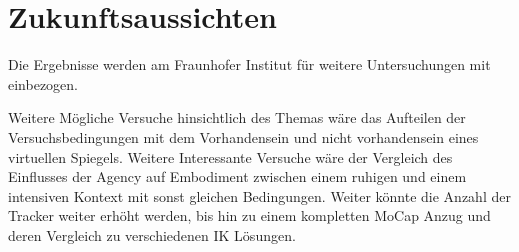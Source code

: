 \section{Zukunftsaussichten}
Die Ergebnisse werden am Fraunhofer Institut für weitere Untersuchungen mit einbezogen.

Weitere Mögliche Versuche hinsichtlich des Themas wäre das Aufteilen der Versuchsbedingungen mit dem Vorhandensein und nicht vorhandensein eines virtuellen Spiegels. Weitere Interessante Versuche wäre der Vergleich des Einflusses der Agency auf Embodiment zwischen einem ruhigen und einem intensiven Kontext mit sonst gleichen Bedingungen. Weiter könnte die Anzahl der Tracker weiter erhöht werden, bis hin zu einem kompletten MoCap Anzug und deren Vergleich zu verschiedenen IK Lösungen.